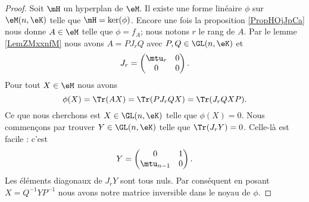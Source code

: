 \begin{proof}
    Soit \( \mH\) un hyperplan de \( \eM\). Il existe une forme linéaire \( \phi\) sur \( \eM(n,\eK)\) telle que \( \mH=\ker(\phi)\). Encore une fois la proposition \ref{PropHOjJpCa} nous donne \( A\in \eM\) telle que \( \phi=f_A\); nous notons \( r\) le rang de \( A\). Par le lemme \ref{LemZMxxnfM} nous avons \( A=PJ_rQ\) avec \( P,Q\in \GL(n,\eK)\) et
    \begin{equation}
        J_r=\begin{pmatrix}
            \mtu_r    &   0    \\ 
            0    &   0    
        \end{pmatrix}.
    \end{equation}
    Pour tout \( X\in \eM\) nous avons
    \begin{equation}
        \phi(X)=\Tr(AX)=\Tr(PJ_rQX)=\Tr(J_rQXP).
    \end{equation}
    Ce que nous cherchons est \( X\in \GL(n,\eK)\) telle que \( \phi(X)=0\). Nous commençons par trouver \( Y\in\GL(n,\eK)\) telle que \( \Tr(J_rY)=0\). Celle-là est facile : c'est
    \begin{equation}
        Y=\begin{pmatrix}
            0    &   1    \\ 
            \mtu_{n-1}    &   0    
        \end{pmatrix}.
    \end{equation}
    Les éléments diagonaux de \( J_rY\) sont tous nuls. Par conséquent en posant \( X=Q^{-1}YP^{-1}\) nous avons notre matrice inversible dans le noyau de \( \phi\).
\end{proof}
